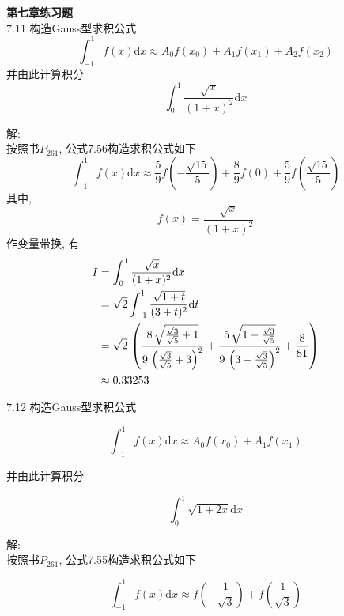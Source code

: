 \documentclass[a4paper, 10pt]{article}
\newcommand{\ud}[1]{\mathrm{d} {#1}}
\begin{document}
\begin{CJK}{UTF8}{gbsn}

\textbf{第七章练习题} \\

7.11
构造Gauss型求积公式
\begin{equation*}
	\int_{-1}^{1}f(x)\ud{x} \approx A_0 f(x_0) + A_1 f(x_1) + A_2 f(x_2)
\end{equation*}
并由此计算积分
\begin{equation*}
	\int_{0}^{1}\frac{\sqrt{x}}{(1+x)^2}\ud{x}
\end{equation*}

解: \\

按照书$P_{261}$, 公式7.56构造求积公式如下
\begin{equation*}
	\int_{-1}^{1}f(x)\ud{x} \approx \frac{5}{9}f(-\frac{\sqrt{15}}{5})+\frac{8}{9}f(0)+\frac{5}{9}f(\frac{\sqrt{15}}{5})
\end{equation*}
其中,
\begin{equation*}
	f(x) = \frac{\sqrt{x}}{(1+x)^2}
\end{equation*}
作变量带换, 有
\begin{align*}
	I & = \int_{0}^{1}\frac{\sqrt{x}}{(1+x)^2}\ud{x} \\
	  & = \sqrt{2}\int_{-1}^{1}\frac{\sqrt{1+t}}{(3+t)^2}\ud{t} \\
	  & = \sqrt{2}\,\left({{8\,\sqrt{{{\sqrt{3}}\over{\sqrt{5}}}+1}}\over{9\,\left({{\sqrt{3}}\over{\sqrt{5}}}+3\right)^2}}+{{5\,\sqrt{1-{{\sqrt{3}}\over{\sqrt{5}}}}}\over{9\,\left(3-{{\sqrt{3}}\over{\sqrt{5}}}\right)^2}}+{{8}\over{81}}\right) \\
	  & \approx 0.33253
\end{align*}


7.12
构造Gauss型求积公式

\begin{equation*}
	\int_{-1}^{1}f(x)\ud{x} \approx A_0 f(x_0) + A_1 f(x_1)
\end{equation*}

并由此计算积分

\begin{equation*}
	\int_{0}^{1}\sqrt{1+2x}\ud{x}
\end{equation*}

解: \\

按照书$P_{261}$, 公式7.55构造求积公式如下

\begin{equation*}
	\int_{-1}^{1}f(x)\ud{x} \approx f(-\frac{1}{\sqrt{3}})+f(\frac{1}{\sqrt{3}})
\end{equation*}



\end{CJK}
\end{document}
